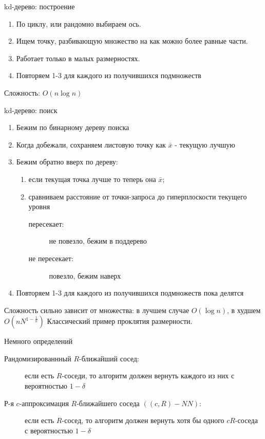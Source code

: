 \documentclass[14pt, fleqn, xcolor={dvipsnames, table}]{beamer}
\begin{document}
\begin{frame}{kd-дерево: построение}
\begin{enumerate}
  \item По циклу, или рандомно выбираем ось.
  \item Ищем точку, разбивающую множество на как можно более равные части.
  \item Работает только в малых размерностях.
  \item Повторяем 1-3 для каждого из получившихся подмножеств
\end{enumerate}
Сложность: $O(n \log n)$
\end{frame}

\begin{frame}{kd-дерево: поиск}
\begin{enumerate}
  \item Бежим по бинарному дереву поиска
  \item Когда добежали, сохраняем листовую точку как $\bar{x}$ - текущую лучшую
  \item Бежим обратно вверх по дереву:
  \begin{enumerate}
    \item если текущая точка лучше то теперь она $\bar{x}$;
    \item сравниваем расстояние от точки-запроса до гиперплоскости текущего уровня
    \begin{description}
      \item [\color{blue}пересекает:] не повезло, бежим в поддерево
      \item [\color{blue}не пересекает:] повезло, бежим наверх  
    \end{description}
  \end{enumerate}
  \item Повторяем 1-3 для каждого из получившихся подмножеств пока делятся
\end{enumerate}
Сложность сильно зависит от множества: в лучшем случае $O(\log n)$, в худшем $O(nN^{1-\frac{1}{n}})$ Классический пример проклятия размерности.
\end{frame}

\begin{frame}{Немного определений}
\small
\begin{description}
  \item [\color{blue}Рандомизированнный $R$-ближайший сосед:] если есть $R$-соседи, то алгоритм должен вернуть каждого из них с вероятностью $1 - \delta$
  \item [\color{blue}Р-я $c$-аппроксимация $R$-ближайшего соседа $((c , R ) - NN )$:] если есть $R$-сосед, то алгоритм должен вернуть хотя бы одного $cR$-соседа с вероятностью $1 - \delta$
\end{description}
\end{frame}
\end{document}
